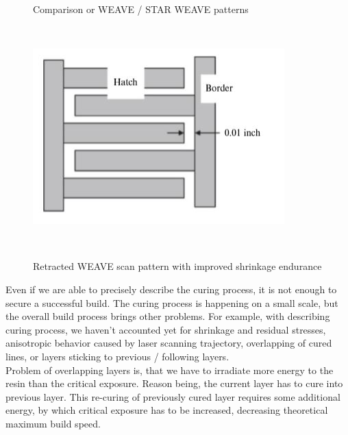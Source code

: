 \documentclass[a4paper, twoside, 11pt]{report}
\begin{document}
\begin{figure}[!t]
\begin{minipage}[t]{0.45\textwidth}
    \caption{Comparison or WEAVE / STAR WEAVE patterns}
  \end{minipage}
  \\[10pt]
  \begin{minipage}[t]{\textwidth}
  \centering
  \includegraphics[scale=0.8]{retractedWeave}
  \caption{Retracted WEAVE scan pattern with improved shrinkage endurance}
  \end{minipage}
  \\[20pt]
\end{figure}
%
Even if we are able to precisely describe the curing process, it is not enough to secure a successful build. The curing process is happening on a small scale, but the overall build process brings other problems. For example, with describing curing process, we haven't accounted yet for shrinkage and residual stresses, anisotropic behavior caused by laser scanning trajectory, overlapping of cured lines, or layers sticking to previous / following layers.\\
Problem of overlapping layers is, that we have to irradiate more energy to the resin than the critical exposure. Reason being, the current layer has to cure into previous layer. This re-curing of previously cured layer requires some additional energy, by which critical exposure has to be increased, decreasing theoretical maximum build speed.\\
\end{document}
